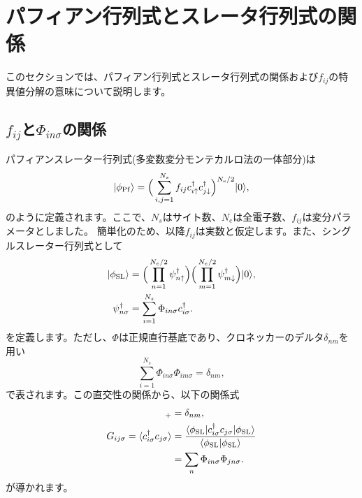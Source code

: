 \section{{パフィアン行列式とスレータ行列式の関係}}
\label{sec:PuffAndSlater}
このセクションでは、パフィアン行列式とスレータ行列式の関係および$f_{ij}$の特異値分解の意味について説明します。
\subsection{$f_{ij}$と$\Phi_{in\sigma}$の関係}
パフィアンスレーター行列式(多変数変分モンテカルロ法の一体部分)は
\begin{equation}
|\phi_{\rm Pf}\rangle=\Big(\sum_{i,j=1}^{N_{s}}f_{ij}c_{i\uparrow}^{\dagger}c_{j\downarrow}^{\dagger}\Big)^{N_{\rm e}/2}|0\rangle,
\end{equation}
のように定義されます。ここで、$N_{s}$はサイト数、$N_{e}$は全電子数、$f_{ij}$は変分パラメータとしました。
簡単化のため、以降$f_{ij}$は実数と仮定します。また、シングルスレーター行列式として
\begin{align}
|\phi_{\rm SL}\rangle&=\Big(\prod_{n=1}^{N_{e}/2}\psi_{n\uparrow}^{\dagger}\Big)
\Big(\prod_{m=1}^{N_{e}/2}\psi_{m\downarrow}^{\dagger}\Big)|0\rangle, \\
\psi_{n\sigma}^{\dagger}&=\sum_{i=1}^{N_{s}}\Phi_{in\sigma}c^{\dagger}_{i\sigma}.
\end{align}
を定義します。ただし、$\Phi$は正規直行基底であり、クロネッカーのデルタ$\delta_{nm}$を用い
\begin{equation}
\sum_{i=1}^{N_{s}}\Phi_{in\sigma}\Phi_{im\sigma}=\delta_{nm},
\end{equation}
で表されます。この直交性の関係から、以下の関係式
\begin{align}
[\psi^{\dagger}_{n\sigma},\psi_{m\sigma}]_{+}&=\delta_{nm},\\
G_{ij\sigma}=\langle c_{i\sigma}^{\dagger}c_{j\sigma}\rangle 
&=\frac{\langle \phi_{\rm SL}| c_{i\sigma}^{\dagger}c_{j\sigma} | \phi_{\rm SL}\rangle}{\langle \phi_{\rm SL}|\phi_{\rm SL}\rangle } \\
&=\sum_{n} \Phi_{in\sigma} \Phi_{jn\sigma}.
\end{align}
が導かれます。

